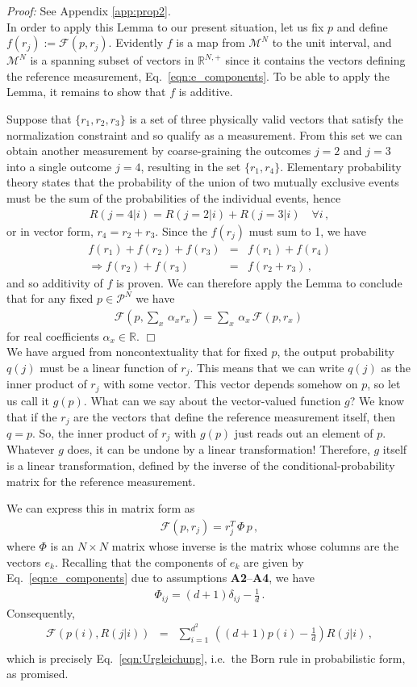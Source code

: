 \documentclass[%
 reprint,superscriptaddress,
 amsmath,amssymb,
 aps,twocolumn,pra
]{revtex4-1}
\newcommand{\eqn}[1]{\begin{eqnarray} #1 \end{eqnarray}}
\newcommand{\tit}[1]{\textit{#1}}
\newcommand{\zum}[2]{\displaystyle\sum_{#1}^{#2}}
\begin{document}
\tit{Proof:} See Appendix \ref{app:prop2}.\\

In order to apply this Lemma to our present situation, let us fix $p$ and define $f(r_j) := \mathcal{F}(p,r_j)$. Evidently $f$ is a map from $\mathcal{M}^N$ to the unit interval, and $\mathcal{M}^N$ is a spanning subset of vectors in $\mathbb{R}^{N,+}$ since it contains the vectors defining the reference measurement, Eq.\ \eqref{eqn:e_components}. To be able to apply the Lemma, it remains to show that $f$ is additive.

Suppose that $\{ r_1, r_2, r_3 \}$ is a set of three physically valid vectors that satisfy the normalization constraint and so qualify as a measurement. From this set we can obtain another measurement by coarse-graining the outcomes $j=2$ and $j=3$ into a single outcome $j=4$, resulting in the set $\{r_1, r_4 \}$. Elementary probability theory states that the probability of the union of two mutually exclusive events must be the sum of the probabilities of the individual events, hence
\eqn{
R(j=4|i) = R(j=2|i) + R(j=3|i) \quad \forall i \, ,
}
or in vector form, $r_4 = r_2 + r_3$. Since the $f(r_j)$ must sum to 1, we have
\eqn{
f(r_1) + f(r_2) + f(r_3) &=& f(r_1) + f(r_4) \nonumber \\
\Rightarrow f(r_2) + f(r_3) &=& f(r_2 + r_3) \, ,
}
and so additivity of $f$ is proven. We can therefore apply the Lemma to conclude that for any fixed $p \in \mathcal{P}^N$ we have
\eqn{
\mathcal{F}\left( p, \zum{x}{} \, \alpha_x r_x \right) =  \zum{x}{} \, \alpha_x \, \mathcal{F} \left(p, r_x \right) \,
}
for real coefficients $\alpha_x \in \mathbb{R}$. $\Box$\\

We have argued from noncontextuality that for fixed $p$, the output probability $q(j)$ must be a linear function of $r_j$. This means that we can write $q(j)$ as the inner product of $r_j$ with some vector. This vector depends somehow on $p$, so let us call it $g(p)$. What can we say about the vector-valued function $g$? We know that if the $r_j$ are the vectors that define the reference measurement itself, then $q = p$. So, the inner product of $r_j$ with $g(p)$ just reads out an element of $p$. Whatever $g$ does, it can be undone by a linear transformation! Therefore, $g$ itself is a linear transformation, defined by the inverse of the conditional-probability matrix for the reference measurement.

We can express this in matrix form as
\eqn{ \label{eqn:matrix_urg}
\mathcal{F}(p,r_j) = r_j^T \, \Phi \, p \, ,
}
where $\Phi$ is an $N \times N$ matrix whose inverse is the matrix whose columns are the vectors $e_k$. Recalling that the components of $e_k$ are given by Eq.\ \eqref{eqn:e_components} due to assumptions {\bf A2}--{\bf A4}, we have
\eqn{
\Phi_{ij} = (d+1)\delta_{ij}-\frac{1}{d} \, .
}
Consequently,
\eqn{
\mathcal{F}\left( p(i),R(j|i) \right) &=& \zum{i=1}{d^2}\, \left( (d+1)p(i)-\frac{1}{d} \right) R(j|i) \, , \nonumber\\
}
which is precisely Eq.\  \eqref{eqn:Urgleichung}, i.e.\ the Born rule in probabilistic form, as promised.
\end{document}
